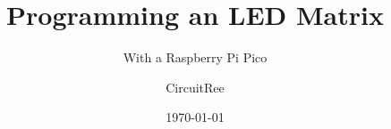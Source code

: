 \documentclass{beamer}
\begin{document}
\title{Programming an LED Matrix}
\subtitle{With a Raspberry Pi Pico}
\author{CircuitRee}

\date{\today}

\begin{frame}{}
  \titlepage
\end{frame}
\end{document}
